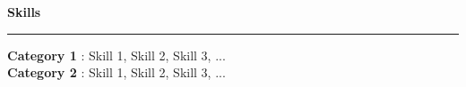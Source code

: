 

\textbf{Skills}

\par\noindent\rule{\textwidth}{0.2pt} 

\noindent
{\textbf{Category 1} : { Skill 1, Skill 2, Skill 3, ...}} \\
{\textbf{Category 2} : { Skill 1, Skill 2, Skill 3, ...}} \\

